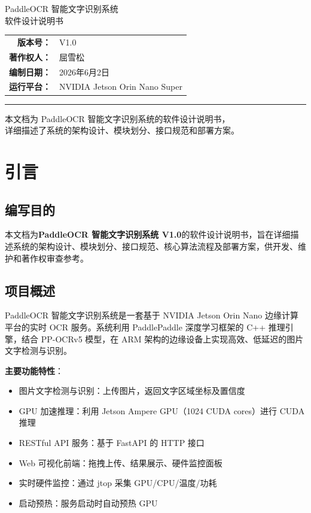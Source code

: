 \documentclass[12pt,a4paper]{ctexart}
\begin{document}
\begin{titlepage}
\centering\vspace*{3cm}
{\heiti{} PaddleOCR 智能文字识别系统}\\[1cm]
{ 软件设计说明书}\\[2.5cm]
\begin{tabular}{rl}
\textbf{版本号：}   & V1.0 \\
\textbf{著作权人：} & 屈雪松 \\
\textbf{编制日期：} & 2026年6月2日 \\
\textbf{运行平台：} & NVIDIA Jetson Orin Nano Super \\
\end{tabular}
\vfill
\noindent\rule{\textwidth}{0.4pt}
{ 本文档为 PaddleOCR 智能文字识别系统的软件设计说明书，\\详细描述了系统的架构设计、模块划分、接口规范和部署方案。}
\end{titlepage}

\tableofcontents\newpage

\section{引言}

\subsection{编写目的}
本文档为\textbf{PaddleOCR 智能文字识别系统 V1.0}的软件设计说明书，旨在详细描述系统的架构设计、模块划分、接口规范、核心算法流程及部署方案，供开发、维护和著作权审查参考。

\subsection{项目概述}
PaddleOCR 智能文字识别系统是一套基于 NVIDIA Jetson Orin Nano 边缘计算平台的实时 OCR 服务。系统利用 PaddlePaddle 深度学习框架的 C++ 推理引擎，结合 PP-OCRv5 模型，在 ARM 架构的边缘设备上实现高效、低延迟的图片文字检测与识别。

\textbf{主要功能特性}：
\begin{itemize}
    \item 图片文字检测与识别：上传图片，返回文字区域坐标及置信度
    \item GPU 加速推理：利用 Jetson Ampere GPU（1024 CUDA cores）进行 CUDA 推理
    \item RESTful API 服务：基于 FastAPI 的 HTTP 接口
    \item Web 可视化前端：拖拽上传、结果展示、硬件监控面板
    \item 实时硬件监控：通过 jtop 采集 GPU/CPU/温度/功耗
    \item 启动预热：服务启动时自动预热 GPU
\end{itemize}
\end{document}
